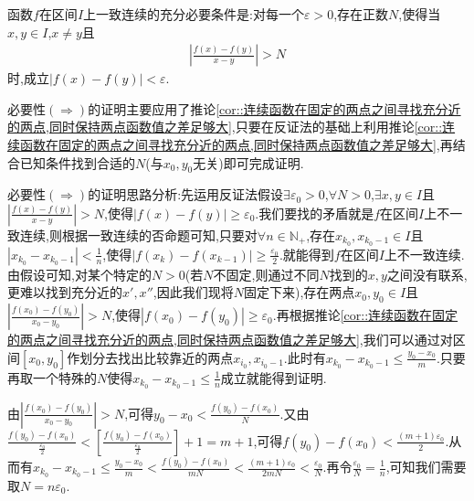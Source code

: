 \documentclass[lang=cn,newtx,10pt,scheme=chinese]{elegantbook}
\begin{document}
\begin{proposition}[一致连续的充要条件]\label{pro:一致连续的充要条件1}
    函数\(f\)在区间\(I\)上一致连续的充分必要条件是:对每一个\(\varepsilon > 0\),存在正数\(N\),使得当\(x,y\in I\),\(x\neq y\)且
\begin{align*}
    \left|\frac{f(x) - f(y)}{x - y}\right| > N
\end{align*}
时,成立\(|f(x) - f(y)|<\varepsilon\).
\end{proposition}
\begin{note}
    必要性$(\Rightarrow)$的证明主要应用了推论\ref{cor::连续函数在固定的两点之间寻找充分近的两点,同时保持两点函数值之差足够大},只要在反证法的基础上利用推论\ref{cor::连续函数在固定的两点之间寻找充分近的两点,同时保持两点函数值之差足够大},再结合已知条件找到合适的$N$(与$x_0,y_0$无关)即可完成证明.

    {\color{blue}必要性$(\Rightarrow)$的证明思路分析:}先运用反证法假设\(\exists \varepsilon _0>0\),\(\forall N>0\),\(\exists x,y\in I\)且\(\left| \frac{f\left( x \right) -f\left( y \right)}{x-y} \right|>N\),使得\(\left| f\left( x \right) -f\left( y \right) \right|\geq \varepsilon _0\).我们要找的矛盾就是$f$在区间$I$上不一致连续,则根据一致连续的否命题可知,只要对\(\forall n\in \mathbb{N} _+\),存在\(x_{k_0},x_{k_0 - 1}\in I\)且\(\left| x_{k_0}-x_{k_0 - 1} \right|<\frac{1}{n}\),使得\(\left| f\left( x_k \right) -f\left( x_{k - 1} \right) \right|\geq \frac{\varepsilon _0}{2}\).就能得到$f$在区间$I$上不一致连续.由假设可知,对某个特定的$N>0$(若$N$不固定,则通过不同$N$找到的$x,y$之间没有联系,更难以找到充分近的$x',x''$,因此我们现将$N$固定下来),存在两点$x_0,y_0\in I$且\(\left| \frac{f\left( x_0 \right) -f\left( y_0 \right)}{x_0-y_0} \right|>N\),使得\(\left| f\left( x_0 \right) -f\left( y_0 \right) \right|\geq \varepsilon _0\).再根据推论\ref{cor::连续函数在固定的两点之间寻找充分近的两点,同时保持两点函数值之差足够大},我们可以通过对区间$[x_0,y_0]$作划分去找出比较靠近的两点$x_{i_0},x_{i_0-1}$.此时有$x_{k_0}-x_{k_0-1}\le \frac{y_0-x_0}{m}$.只要再取一个特殊的$N$使得$x_{k_0}-x_{k_0-1}\le \frac{1}{n}$成立就能得到证明.
    
    由$\left| \frac{f\left( x_0 \right) -f\left( y_0 \right)}{x_0-y_0} \right|>N
    $,可得$y_0-x_0<\frac{f\left( y_0 \right) -f\left( x_0 \right)}{N}$.又由$\frac{f\left( y_0 \right) -f\left( x_0 \right)}{\frac{\varepsilon _0}{2}}<\left[ \frac{f\left( y_0 \right) -f\left( x_0 \right)}{\frac{\varepsilon _0}{2}} \right] +1=m+1$,可得$f\left( y_0 \right) -f\left( x_0 \right) <\frac{\left( m+1 \right) \varepsilon _0}{2}$.从而有$x_{k_0}-x_{k_0-1}\le \frac{y_0-x_0}{m}<\frac{f\left( y_0 \right) -f\left( x_0 \right)}{mN}<\frac{\left( m+1 \right) \varepsilon _0}{2mN}<\frac{\varepsilon _0}{N}$.再令$\frac{\varepsilon _0}{N}=\frac{1}{n}$,可知我们需要取$N=n\varepsilon _0$.
\end{note}
\end{document}
